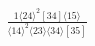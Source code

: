 \documentclass[varwidth, border=5pt]{standalone}
\begin{document}
\begin{my}
$\begin{gathered}
\scriptscriptstyle\frac{1⟨24⟩^2[34]⟨15⟩}{⟨14⟩^2⟨23⟩⟨34⟩[35]}
\end{gathered}$
\end{my}
\end{document}
